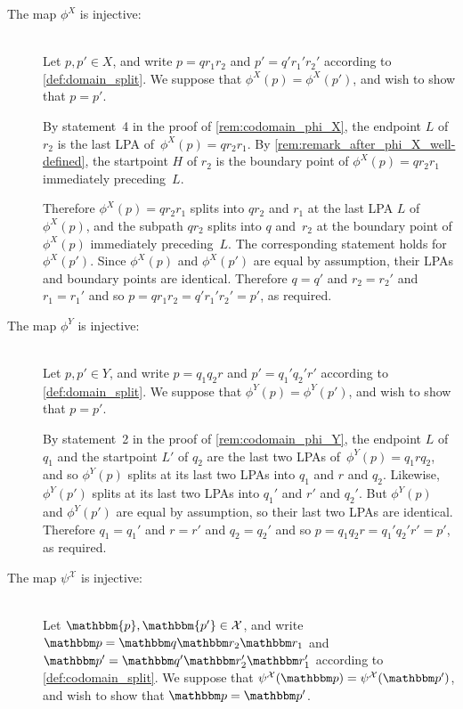 \documentclass[11pt]{article}
\theoremstyle{definition} %
\numberwithin{equation}{section}
\begin{document}
\begin{description}
    \item[The map $\phi^X$ is injective:]\hfill \\[6pt]
        Let $p,p' \in X$, and write $p = q r_1 r_2$ and $p' = q' r_1' r_2'$ according to \cref{def:domain_split}. We suppose that $\phi^X(p) = \phi^X(p')$, and wish to show that $p=p'$.

        By statement~4 in the proof of \cref{rem:codomain_phi_X},
        the endpoint $L$ of $r_2$ is the last LPA of~$\phi^X(p) = q r_2 r_1$.
        By \cref{rem:remark_after_phi_X_well-defined},
        the startpoint $H$ of $r_2$ is the boundary point of $\phi^X(p) = qr_2r_1$ immediately preceding~$L$.

        Therefore $\phi^X(p) = qr_2r_1$ splits into $qr_2$ and $r_1$ at the last LPA $L$ of~$\phi^X(p)$, and the subpath $qr_2$ splits into $q$ and~$r_2$ at the boundary point of $\phi^X(p)$ immediately preceding~$L$. The corresponding statement holds for $\phi^X(p')$. Since $\phi^X(p)$ and $\phi^X(p')$ are equal by assumption, their LPAs and boundary points are identical. 
        Therefore $q = q'$ and $r_2=r_2'$ and $r_1 = r_1'$ and so 
        $p = q r_1 r_2 = q' r_1' r_2' = p'$, as required.

    \item[The map $\phi^Y$ is injective:]\hfill \\[6pt]
        Let $p, p' \in Y$, and write $p = q_1 q_2 r$ and $p' = q_1' q_2' r'$ according to \cref{def:domain_split}. 
        We suppose that $\phi^Y(p) = \phi^Y(p')$,
        and wish to show that $p = p'$. 

        By statement~2 in the proof of \cref{rem:codomain_phi_Y}, the endpoint $L$ of $q_1$ and the startpoint $L'$ of $q_2$
        are the last two LPAs of~$\phi^Y(p)=q_1 r q_2$, and so  $\phi^Y(p)$ splits at its last two LPAs into $q_1$ and $r$ and $q_2$.
        Likewise, $\phi^Y(p')$ splits at its last two LPAs into $q_1'$ and $r'$ and $q_2'$. But $\phi^Y(p)$ and $\phi^Y(p')$ are equal by assumption, so their last two LPAs are identical. Therefore $q_1 = q_1'$ and $r=r'$ and $q_2 = q_2'$ and so 
        $p = q_1 q_2 r = q_1' q_2' r' = p'$, as required.
        
    \item[The map $\psi^\mathcal X$ is injective:]\hfill \\[6pt]
        Let $\mathbbm{p}, \mathbbm {p'} \in \mathcal X$, and write $\mathbbm p = \mathbbm q \mathbbm r_2 \mathbbm r_1$ and $\mathbbm p' = \mathbbm q' \mathbbm r_2' \mathbbm r_1'$ according to \cref{def:codomain_split}. 
        We suppose that $\psi^\mathcal X(\mathbbm p) = \psi^\mathcal X(\mathbbm p')$, and wish to show that $\mathbbm p=\mathbbm p'$.


\end{description}
\end{document}
